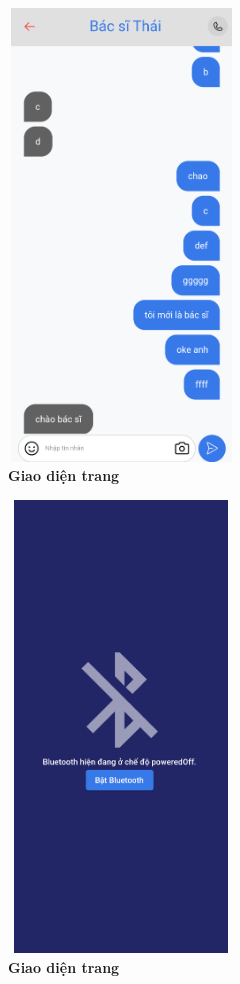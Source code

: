 \begin{figure}[H]
  \centering
  \includegraphics[width=6cm,height=12cm]{Images/mobile_app/demo/chat_detail.png}
  \caption[Giao diện trang]{\bfseries \fontsize{12pt}{0pt}\selectfont Giao diện trang}
  \label{demo_} %
\end{figure}

\begin{figure}[H]
  \centering
  \includegraphics[width=6cm,height=12cm]{Images/mobile_app/demo/off_bluetooth.png}
  \caption[Giao diện trang]{\bfseries \fontsize{12pt}{0pt}\selectfont Giao diện trang}
  \label{demo_} %
\end{figure}

